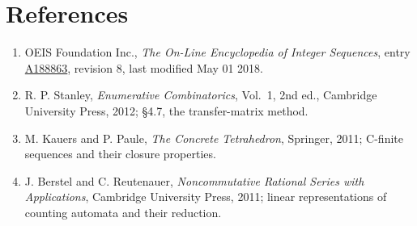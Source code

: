 \documentclass[11pt]{article}
\theoremstyle{definition}
\begin{document}
\section{References}

\begin{enumerate}

\item OEIS Foundation Inc., \emph{The On-Line Encyclopedia of Integer Sequences}, entry \href{https://oeis.org/A188863}{A188863}, revision 8, last modified May 01 2018.

\item R. P. Stanley, \emph{Enumerative Combinatorics}, Vol.~1, 2nd ed., Cambridge University Press, 2012; \S4.7, the transfer-matrix method.

\item M. Kauers and P. Paule, \emph{The Concrete Tetrahedron}, Springer, 2011; C-finite sequences and their closure properties.

\item J. Berstel and C. Reutenauer, \emph{Noncommutative Rational Series with Applications}, Cambridge University Press, 2011; linear representations of counting automata and their reduction.

\end{enumerate}
\end{document}
